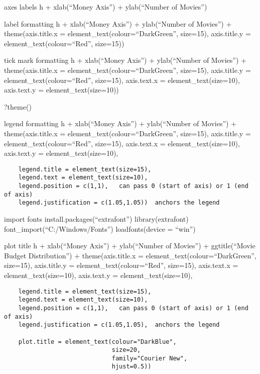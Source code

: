 \documentclass[]{article}
\begin{document}
axes labels h + xlab(``Money Axis'') + ylab(``Number of Movies'')

label formatting h + xlab(``Money Axis'') + ylab(``Number of Movies'') +
theme(axis.title.x = element\_text(colour=``DarkGreen'', size=15),
axis.title.y = element\_text(colour=``Red'', size=15))

tick mark formatting h + xlab(``Money Axis'') + ylab(``Number of
Movies'') + theme(axis.title.x = element\_text(colour=``DarkGreen'',
size=15), axis.title.y = element\_text(colour=``Red'', size=15),
axis.text.x = element\_text(size=10), axis.text.y =
element\_text(size=10))

?theme()

legend formatting h + xlab(``Money Axis'') + ylab(``Number of Movies'')
+ theme(axis.title.x = element\_text(colour=``DarkGreen'', size=15),
axis.title.y = element\_text(colour=``Red'', size=15), axis.text.x =
element\_text(size=10), axis.text.y = element\_text(size=10),

\begin{verbatim}
    legend.title = element_text(size=15),
    legend.text = element_text(size=10),
    legend.position = c(1,1),   can pass 0 (start of axis) or 1 (end of axis)
    legend.justification = c(1.05,1.05))  anchors the legend      
\end{verbatim}

import fonts install.packages(``extrafont'') library(extrafont)
font\_import(``C:/Windows/Fonts'') loadfonts(device = ``win'')

plot title h + xlab(``Money Axis'') + ylab(``Number of Movies'') +
ggtitle(``Movie Budget Distribution'') + theme(axis.title.x =
element\_text(colour=``DarkGreen'', size=15), axis.title.y =
element\_text(colour=``Red'', size=15), axis.text.x =
element\_text(size=10), axis.text.y = element\_text(size=10),

\begin{verbatim}
    legend.title = element_text(size=15),
    legend.text = element_text(size=10),
    legend.position = c(1,1),   can pass 0 (start of axis) or 1 (end of axis)
    legend.justification = c(1.05,1.05),  anchors the legend
    
    plot.title = element_text(colour="DarkBlue", 
                              size=20, 
                              family="Courier New",
                              hjust=0.5))
\end{verbatim}
\end{document}

